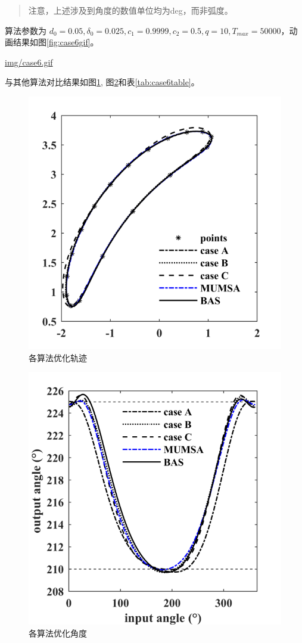 \documentclass[]{ctexbook}
\theoremstyle{definition}
\theoremstyle{definition}
\theoremstyle{definition}
\theoremstyle{remark}
\begin{document}
\begin{quote}
注意，上述涉及到角度的数值单位均为deg，而非弧度。
\end{quote}

算法参数为
\(d_0 = 0.05,\delta_0=0.025,c_1=0.9999,c_2=0.5,q=10,T_{max}=50000\)，动画结果如图\ref{fig:case6gif}。

\url{img/case6.gif}

与其他算法对比结果如图\ref{fig:case6png},
图\ref{fig:case6png2}和表\ref{tab:case6table}。

\begin{figure}

{\centering \includegraphics[width=0.5\linewidth]{img/case6png} 

}

\caption{各算法优化轨迹}\label{fig:case6png}
\end{figure}

\begin{figure}

{\centering \includegraphics[width=0.5\linewidth]{img/case6png2} 

}

\caption{各算法优化角度}\label{fig:case6png2}
\end{figure}
\end{document}
